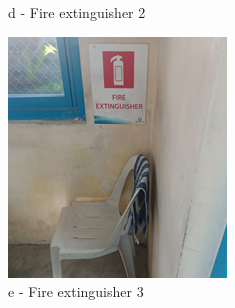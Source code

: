 \begin{figure}[!htb]
\begin{minipage}[b]{0.22\linewidth}
		\caption*{d - Fire extinguisher 2}
	\end{minipage}
	\hspace{0.03cm}
	\begin{minipage}[b]{0.22\linewidth}
		\centering
		\includegraphics[width=\textwidth]{figures/ch05_fdas_sd11}
		\caption*{e - Fire extinguisher 3}
	\end{minipage}
	\hspace{0.03cm}
	\begin{minipage}[b]{0.22\linewidth}
		\centering

\end{minipage}
\end{figure}
